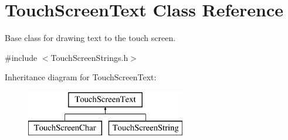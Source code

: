 \hypertarget{class_touch_screen_text}{\section{Touch\+Screen\+Text Class Reference}
\label{class_touch_screen_text}
}


Base class for drawing text to the touch screen.  




{\ttfamily \#include $<$Touch\+Screen\+Strings.\+h$>$}

Inheritance diagram for Touch\+Screen\+Text\+:\begin{figure}[H]
\begin{center}
\leavevmode
\includegraphics[height=2.000000cm]{class_touch_screen_text}
\end{center}
\end{figure}
